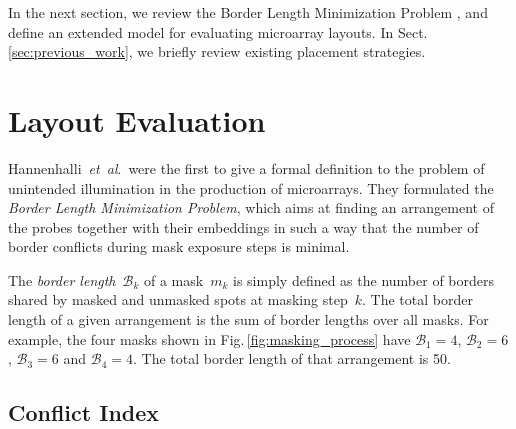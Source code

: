 \documentclass[runningheads]{llncs}
\newcommand{\ignore}[1]{}
\begin{document}
\ignore{
We believe that better solutions can be found if, during the placement, we also
consider the various embeddings that a probe can have. In this paper we present
a new algorithm... %
}

In the next section, we review the Border Length Minimization Problem
\cite{HANNENHALLI02}, and define an extended model for evaluating microarray
layouts. In Sect.\,\ref{sec:previous_work}, we briefly review existing
placement strategies. %


\section{Layout Evaluation}
\label{sec:eval}

Hannenhalli~{\it et~al}.\ were the first to give a formal definition to the problem
of unintended illumination in the production of microarrays. They formulated the
\emph{Border Length Minimization Problem}\cite{HANNENHALLI02}, which aims at finding
an arrangement of the probes together with their embeddings in such a way that the number
of border conflicts during mask exposure steps is minimal.

The \emph{border length}~$\mathcal{B}_k$ of a mask~$m_{k}$ is simply
defined as the number of borders shared by masked and unmasked spots
at masking step~$k$. The total border length of a given arrangement is
the sum of border lengths over all masks. For example, the four masks
shown in Fig.\,\ref{fig:masking_process} have
$\mathcal{B}_1 = 4$, $\mathcal{B}_2 = 6$, $\mathcal{B}_3 = 6$ and $\mathcal{B}_4 = 4$.
The total border length of that arrangement is 50.

\subsection{Conflict Index}
\label{sec:conflict_index}
\end{document}

